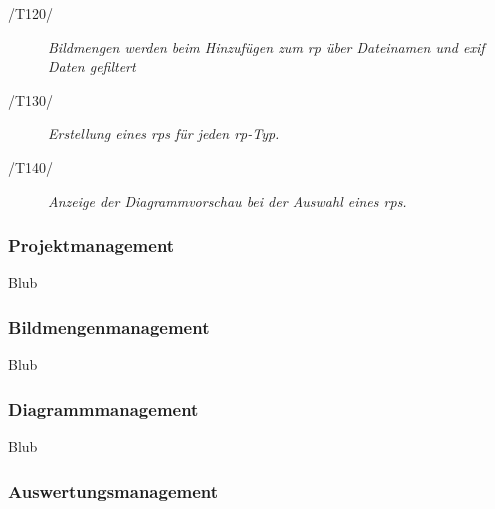 \begin{description}
				\item[/T120/] \textit{Bildmengen werden beim Hinzufügen zum \gls{rp} über Dateinamen und \gls{exif} Daten gefiltert}\par
				
				\item[/T130/] \textit{Erstellung eines \gls{rp}s für jeden \gls{rp}-Typ.}\par
				
				\item[/T140/] \textit{Anzeige der Diagrammvorschau bei der Auswahl eines \gls{rp}s. }\par
		
		\end{description}

	\subsubsection{Projektmanagement}
	
		\begin{description}
		
			\item[Blub]
		
		\end{description}
	
	\subsubsection{Bildmengenmanagement}
		
		\begin{description}
		
			\item[Blub]
		
		\end{description}
	
	\subsubsection{Diagrammmanagement}
	
		\begin{description}
			
			\item[Blub]
			
		\end{description}
	
	\subsubsection{Auswertungsmanagement}

